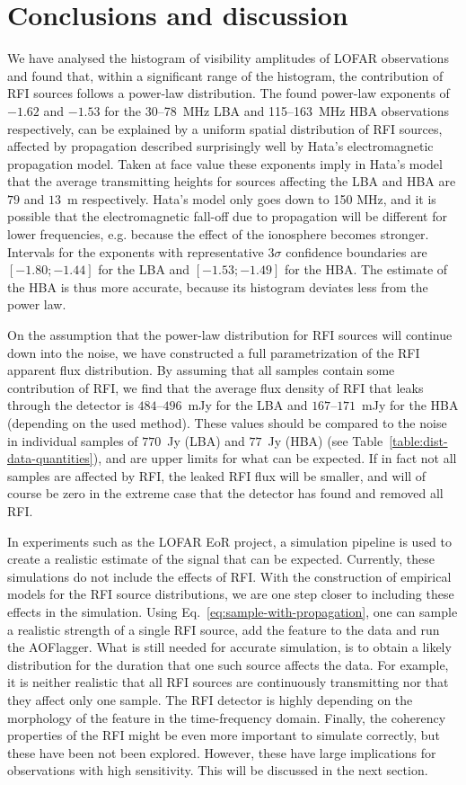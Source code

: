 \documentclass[useAMS,usenatbib]{mn2e}
\begin{document}
\section{Conclusions and discussion} \label{sec:dist-discussion}
We have analysed the histogram of visibility amplitudes of LOFAR observations and found that, within a significant range of the histogram, the contribution of RFI sources follows a power-law distribution. The found power-law exponents of $-1.62$ and $-1.53$ for the 30--78~MHz LBA and 115--163~MHz HBA observations respectively, can be explained by a uniform spatial distribution of RFI sources, affected by propagation described surprisingly well by Hata's electromagnetic propagation model. Taken at face value these exponents imply in Hata's model that the average transmitting heights for sources affecting the LBA and HBA are $79$ and $13$~m respectively. Hata's model only goes down to 150 MHz, and it is possible that the electromagnetic fall-off due to propagation will be different for lower frequencies, e.g. because the effect of the ionosphere becomes stronger. Intervals for the exponents with representative $3\sigma$ confidence boundaries are $[-1.80;-1.44]$ for the LBA and $[-1.53;-1.49]$ for the HBA. The estimate of the HBA is thus more accurate, because its histogram deviates less from the power law.

On the assumption that the power-law distribution for RFI sources will continue down into the noise, we have constructed a full parametrization of the RFI apparent flux distribution. By assuming that all samples contain some contribution of RFI, we find that the average flux density of RFI that leaks through the detector is $484$--$496$~mJy for the LBA and $167$--$171$~mJy for the HBA (depending on the used method). These values should be compared to the noise in individual samples of $770$~Jy (LBA) and $77$~Jy (HBA) (see Table~\ref{table:dist-data-quantities}), and are upper limits for what can be expected. If in fact not all samples are affected by RFI, the leaked RFI flux will be smaller, and will of course be zero in the extreme case that the detector has found and removed all RFI.

In experiments such as the LOFAR EoR project, a simulation pipeline is used to create a realistic estimate of the signal that can be expected. Currently, these simulations do not include the effects of RFI. With the construction of empirical models for the RFI source distributions, we are one step closer to including these effects in the simulation. Using Eq.~\eqref{eq:sample-with-propagation}, one can sample a realistic strength of a single RFI source, add the feature to the data and run the AOFlagger. What is still needed for accurate simulation, is to obtain a likely distribution for the duration that one such source affects the data. For example, it is neither realistic that all RFI sources are continuously transmitting nor that they affect only one sample. The RFI detector is highly depending on the morphology of the feature in the time-frequency domain. Finally, the coherency properties of the RFI might be even more important to simulate correctly, but these have been not been explored. However, these have large implications for observations with high sensitivity. This will be discussed in the next section. 
\end{document}
